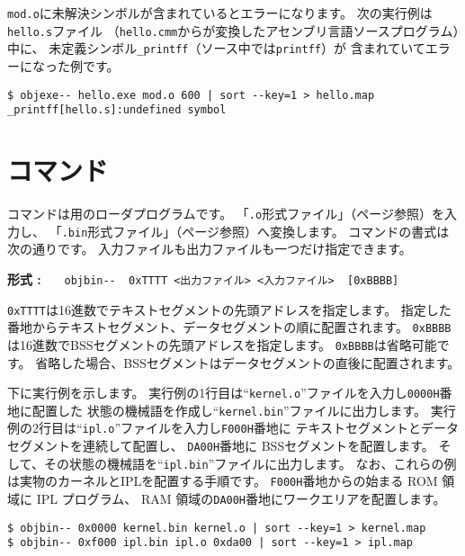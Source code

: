 \verb/mod.o/に未解決シンボルが含まれているとエラーになります。
次の実行例は\verb/hello.s/ファイル
（\verb/hello.cmm/から\cmmc が変換したアセンブリ言語ソースプログラム）中に、
未定義シンボル\verb/_printff/（\cmm ソース中では\verb/printff/）が
含まれていてエラーになった例です。

\begin{mylist}
\begin{verbatim}
$ objexe-- hello.exe mod.o 600 | sort --key=1 > hello.map
_printff[hello.s]:undefined symbol
\end{verbatim}
\end{mylist}

\section{{\objbin}コマンド}

{\objbin}コマンドは{\tac}用のローダプログラムです。
「\verb/.o/形式ファイル」（\pageref{app:oformat}ページ参照）を入力し、
「\verb/.bin/形式ファイル」（\pageref{app:bformat}ページ参照）へ変換します。
{\objbin}コマンドの書式は次の通りです。
入力ファイルも出力ファイルも一つだけ指定できます。

\begin{flushleft}
{\bf 形式 : }~~~\verb/objbin--  0xTTTT <出力ファイル> <入力ファイル>  [0xBBBB]/
\end{flushleft}

\verb/0xTTTT/は16進数でテキストセグメントの先頭アドレスを指定します。
指定した番地からテキストセグメント、データセグメントの順に配置されます。
\verb/0xBBBB/は16進数でBSSセグメントの先頭アドレスを指定します。
\verb/0xBBBB/は省略可能です。
省略した場合、BSSセグメントはデータセグメントの直後に配置されます。

下に実行例を示します。
実行例の1行目は``\verb/kernel.o/''ファイルを入力し\verb/0000H/番地に配置した
状態の機械語を作成し``\verb/kernel.bin/''ファイルに出力します。
実行例の2行目は``\verb/ipl.o/''ファイルを入力し\verb/F000H/番地に
テキストセグメントとデータセグメントを連続して配置し、
\verb/DA00H/番地に BSSセグメントを配置します。
そして、その状態の機械語を``\verb/ipl.bin/''ファイルに出力します。
なお、これらの例は実物のカーネルとIPLを配置する手順です。
\verb/F000H/番地からの始まる ROM 領域に IPL プログラム、
RAM 領域の\verb/DA00H/番地にワークエリアを配置します。

\begin{mylist}
\begin{verbatim}
$ objbin-- 0x0000 kernel.bin kernel.o | sort --key=1 > kernel.map
$ objbin-- 0xf000 ipl.bin ipl.o 0xda00 | sort --key=1 > ipl.map
\end{verbatim}
\end{mylist}

